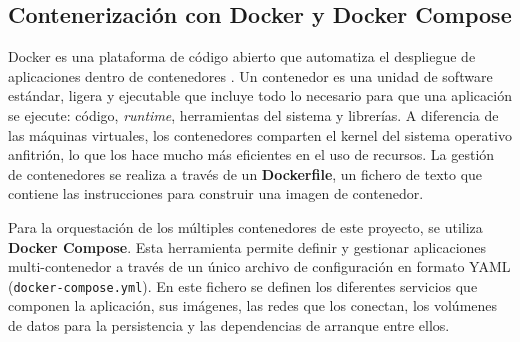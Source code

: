 \subsection{Contenerización con Docker y Docker Compose}
Docker es una plataforma de código abierto que automatiza el despliegue de aplicaciones dentro de contenedores \cite{docker_docs}. Un contenedor es una unidad de software estándar, ligera y ejecutable que incluye todo lo necesario para que una aplicación se ejecute: código, \textit{runtime}, herramientas del sistema y librerías. A diferencia de las máquinas virtuales, los contenedores comparten el kernel del sistema operativo anfitrión, lo que los hace mucho más eficientes en el uso de recursos. La gestión de contenedores se realiza a través de un \textbf{Dockerfile}, un fichero de texto que contiene las instrucciones para construir una imagen de contenedor.

Para la orquestación de los múltiples contenedores de este proyecto, se utiliza \textbf{Docker Compose}. Esta herramienta permite definir y gestionar aplicaciones multi-contenedor a través de un único archivo de configuración en formato YAML (\texttt{docker-compose.yml}). En este fichero se definen los diferentes servicios que componen la aplicación, sus imágenes, las redes que los conectan, los volúmenes de datos para la persistencia y las dependencias de arranque entre ellos.

